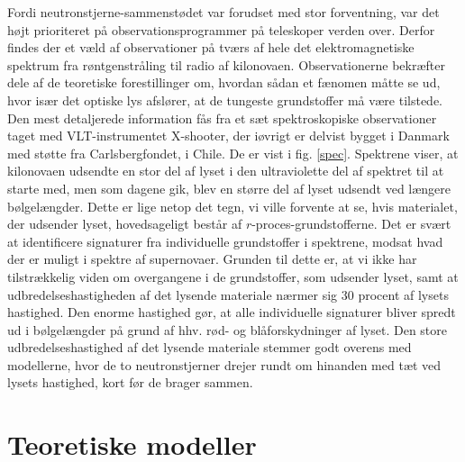 \documentclass[twocolumn]{article}
\begin{document}
Fordi neutronstjerne-sammenstødet var forudset med stor forventning, var det højt prioriteret på observationsprogrammer på teleskoper verden over. Derfor findes der et væld af observationer på tværs af hele det elektromagnetiske spektrum fra røntgenstråling til radio af kilonovaen. Observationerne bekræfter dele af de teoretiske forestillinger om, hvordan sådan et fænomen måtte se ud, hvor især det optiske lys afslører, at de tungeste grundstoffer må være tilstede. Den mest detaljerede information fås fra et sæt spektroskopiske observationer taget med VLT-instrumentet X-shooter, der iøvrigt er delvist bygget i Danmark med støtte fra Carlsbergfondet, i Chile. De er vist i fig. \ref{spec}. Spektrene viser, at kilonovaen udsendte en stor del af lyset i den ultraviolette del af spektret til at starte med, men som dagene gik, blev en større del af lyset udsendt ved længere bølgelængder. Dette er lige netop det tegn, vi ville forvente at se, hvis materialet, der udsender lyset, hovedsageligt består af $r$-proces-grundstofferne. Det er svært at identificere signaturer fra individuelle grundstoffer i spektrene, modsat hvad der er muligt i spektre af supernovaer. Grunden til dette er, at vi ikke har tilstrækkelig viden om overgangene i de grundstoffer, som udsender lyset, samt at udbredelseshastigheden af det lysende materiale nærmer sig 30 procent af lysets hastighed. Den enorme hastighed gør, at alle individuelle signaturer bliver spredt ud i bølgelængder på grund af hhv. rød- og blåforskydninger af lyset. Den store udbredelseshastighed af det lysende materiale stemmer godt overens med modellerne, hvor de to neutronstjerner drejer rundt om hinanden med tæt ved lysets hastighed, kort før de brager sammen.


\section{Teoretiske modeller}\label{teo}
\end{document}
